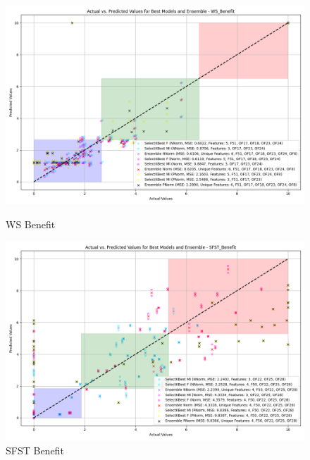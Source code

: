 \begin{figure}[H]
    \centering
    \begin{minipage}{0.45\textwidth}
        \centering
        \includegraphics[width=\linewidth]{reg_section_specific/featred_ensemble_learning/actual_vs_predicted_best_feature_selection_and_ensemble_WS_Benefit_10.png}
        \caption{WS Benefit}
        \label{reg_spec_fig:ws_ben_featred}
    \end{minipage}\hfill
    \begin{minipage}{0.45\textwidth}
        \centering
        \includegraphics[width=\linewidth]{reg_section_specific/featred_ensemble_learning/actual_vs_predicted_best_feature_selection_and_ensemble_SFST_Benefit_10.png}
        \caption{SFST Benefit}
        \label{reg_spec_fig:sfst_ben_featred}
    \end{minipage}
\end{figure}
